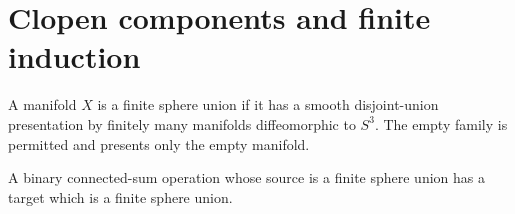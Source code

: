 \section{Clopen components and finite induction}
\label{sec:sphere-union-induction}

\begin{definition}
\label{def:sphere-union}
A manifold $X$ is a finite sphere union if it has a smooth disjoint-union
presentation by finitely many manifolds diffeomorphic to $S^3$.
The empty family is permitted and presents only the empty manifold.
\end{definition}

\begin{lemma}
\label{lem:sphere-union-step}
A binary connected-sum operation whose source is a finite sphere union
has a target which is a finite sphere union.
\end{lemma}

